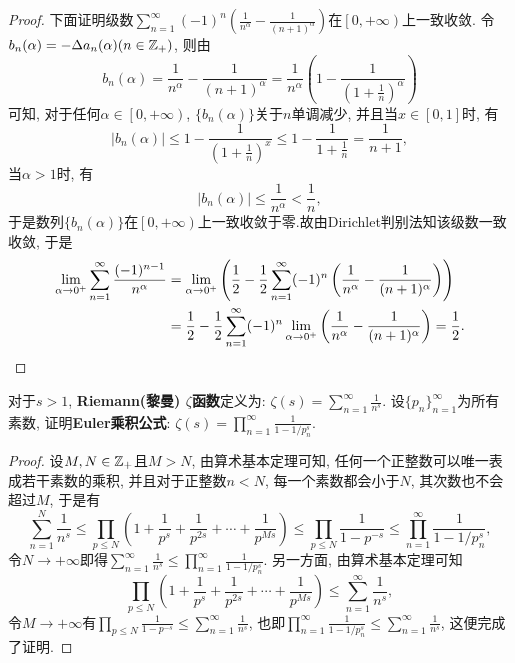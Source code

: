 \begin{quizb}
\begin{proof}
下面证明级数\(\sum_{n=1}^{\infty}(-1)^n\left(\frac{1}{n^\alpha}-\frac{1}{(n+1)^\alpha}\right)\)在\(\left[0,+\infty\right)\)上一致收敛. 令\(b_n(\alpha)=-\Delta a_n(\alpha)(n\in\mathbb{Z}_+)\), 则由\[b_n(\alpha)=\frac{1}{n^\alpha}-\frac{1}{(n+1)^\alpha}=\frac{1}{n^\alpha}\left(1-\frac{1}{\left(1+\displaystyle\frac{1}{n}\right)^\alpha}\right)\]可知, 对于任何\(\alpha\in\left[0,+\infty\right)\), \(\{b_n(\alpha)\}\)关于\(n\)单调减少, 并且当\(x\in[0,1]\)时, 有\[\left|b_n(\alpha)\right|\leqslant 1-\frac{1}{\displaystyle\left(1+\frac{1}{n}\right)^x}\leqslant 1-\frac{1}{\displaystyle 1+\frac{1}{n}}=\frac{1}{n+1},\]
当\(\alpha>1\)时, 有\[\left|b_n(\alpha)\right|\leqslant\frac{1}{n^\alpha}<\frac{1}{n},\]于是数列\(\{b_n(\alpha)\}\)在\(\left[0,+\infty\right)\)上一致收敛于零.故由Dirichlet判别法知该级数一致收敛, 于是\[\begin{split}
\lim_{\alpha\rightarrow 0^+}\sum_{n=1}^{\infty}\frac{(-1)^{n-1}}{n^\alpha}&=\lim_{\alpha\rightarrow0^+}\left(\frac{1}{2}-\frac{1}{2}\sum_{n=1}^{\infty}(-1)^n\left(\frac{1}{n^\alpha}-\frac{1}{(n+1)^\alpha}\right)\right)\\&=\frac{1}{2}-\frac{1}{2}\sum_{n=1}^{\infty}(-1)^n\lim_{\alpha\rightarrow0^+}\left(\frac{1}{n^\alpha}-\frac{1}{(n+1)^\alpha}\right)=\frac{1}{2}.\qedhere
\end{split}\]
\end{proof}
\woe 对于\(s>1\), \textbf{Riemann(黎曼) \(\zeta\)函数}定义为: \(\zeta(s)=\sum_{n=1}^{\infty}\frac{1}{n^s}\). 设\(\{p_n\}_{n=1}^{\infty}\)为所有素数, 证明\textbf{Euler乘积公式}: \(\zeta(s)=\prod_{n=1}^{\infty}\frac{1}{1-1/p_n^s}\).
\begin{proof}
设\(M,N\in\mathbb{Z}_+\)且\(M>N\), 由算术基本定理可知, 任何一个正整数可以唯一表成若干素数的乘积, 并且对于正整数\(n<N\), 每一个素数都会小于\(N\), 其次数也不会超过\(M\), 于是有\[\sum_{n=1}^{N}\frac{1}{n^s}\leqslant\prod_{p\leqslant N}\left(1+\frac{1}{p^s}+\frac{1}{p^{2s}}+\cdots+\frac{1}{p^{Ms}}\right)\leqslant\prod_{p\leqslant N}\frac{1}{1-p^{-s}}\leqslant\prod_{n=1}^{\infty}\frac{1}{1-1/p_n^s},\]
令\(N\rightarrow+\infty\)即得\(\sum_{n=1}^{\infty}\frac{1}{n^s}\leqslant\prod_{n=1}^{\infty}\frac{1}{1-1/p_n^s}\). 另一方面, 由算术基本定理可知\[\prod_{p\leqslant N}\left(1+\frac{1}{p^s}+\frac{1}{p^{2s}}+\cdots+\frac{1}{p^{Ms}}\right)\leqslant \sum_{n=1}^{\infty}\frac{1}{n^s},\]令\(M\rightarrow+\infty\)有\(\prod_{p\leqslant N}\frac{1}{1-p^{-s}}\leqslant\sum_{n=1}^{\infty}\frac{1}{n^s}\), 也即\(\prod_{n=1}^{\infty}\frac{1}{1-1/p_n^s}\leqslant\sum_{n=1}^{\infty}\frac{1}{n^s}\), 这便完成了证明.
\end{proof}

\end{quizb}
